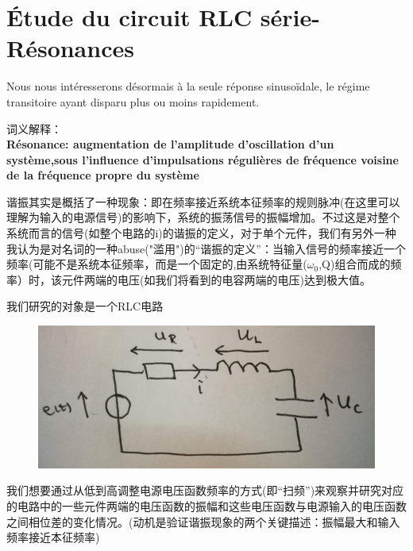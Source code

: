 \documentclass[12pt]{book}
\theoremstyle{definition}\newtheorem{dfn}{Définition}[chapter]
\theoremstyle{plain}\newtheorem{thm}{Théorème}[chapter]
\theoremstyle{plain}\newtheorem{prp}{Proposition}[chapter]
\theoremstyle{plain}\newtheorem{lem}{\bf Lemme}[chapter]
\theoremstyle{plain}\newtheorem{axm}{\bf Axiome}[chapter]
\theoremstyle{plain}\newtheorem{lmm}{\bf Lemme}[chapter]
\theoremstyle{plain}\newtheorem{cor}{\bf Corollaire}[chapter]
\theoremstyle{remark}\newtheorem{rem}{Remarque}[chapter]
\begin{document}
\chapter{Étude du circuit RLC série-Résonances}
Nous nous intéresserons désormais à la seule réponse sinusoïdale, le régime
transitoire ayant disparu plus ou moins rapidement.

词义解释：\\
\textbf{Résonance: augmentation de l'amplitude d'oscillation d'un système,sous l'influence d'impulsations régulières de fréquence voisine de la fréquence propre du système}

谐振其实是概括了一种现象：即在{\color{red}频率接近系统本征频率}的规则脉冲(在这里可以理解为输入的电源信号)的影响下，系统的振荡信号的振幅增加。不过这是对整个系统而言的信号(如整个电路的i)的谐振的定义，对于单个元件，我们有另外一种我认为是对名词的一种abuse("滥用")的“谐振的定义”：当输入信号的频率接近一个频率(可能不是系统本征频率，而是一个固定的,由系统特征量($\omega_0$,Q)组合而成的频率）时，该元件两端的电压(如我们将看到的电容两端的电压)达到极大值。

我们研究的对象是一个RLC电路
\begin{figure}[H]
	\centering
	\includegraphics[scale=0.2]{Etude du circuit RLC serie-Resonances//1}
\end{figure}
我们想要通过从低到高调整电源电压函数频率的方式(即“扫频”)来观察并研究对应的电路中的一些元件两端的电压函数的振幅和这些电压函数与电源输入的电压函数之间相位差的变化情况。(动机是验证谐振现象的两个关键描述：振幅最大和输入频率接近本征频率)
\end{document}
